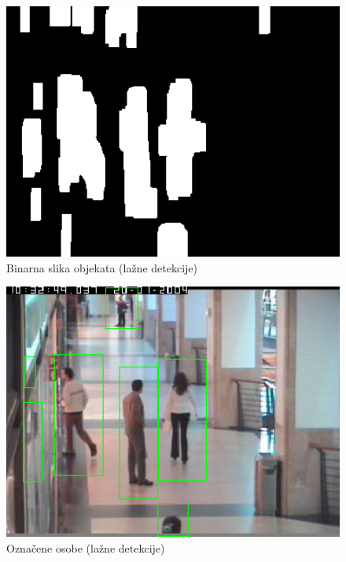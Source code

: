 \documentclass[times, utf8, seminar, numeric]{fer}
\begin{document}
\begin{figure}
\centering
\includegraphics[width=1\textwidth]{lazna_fore.png}
\caption{Binarna slika objekata (lažne detekcije)}
\label{lazna_fore}
\end{figure}

\begin{figure}
\centering
\includegraphics[width=1\textwidth]{lazna_detekt.png}
\caption{Označene osobe (lažne detekcije)}
\label{lazna_detekt}
\end{figure}

\end{document}
